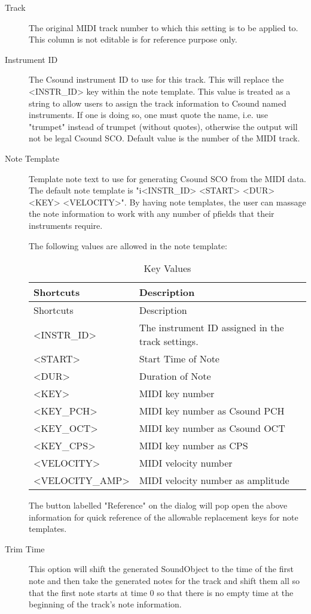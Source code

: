 \begin{description}
\item[Track]
The original MIDI track number to which this setting is to be applied
to. This column is not editable is for reference purpose only.
\item[Instrument ID]
The Csound instrument ID to use for this track. This will replace the
\textless{}INSTR\_ID\textgreater{} key within the note template. This
value is treated as a string to allow users to assign the track
information to Csound named instruments. If one is doing so, one must
quote the name, i.e. use "trumpet" instead of trumpet (without quotes),
otherwise the output will not be legal Csound SCO. Default value is the
number of the MIDI track.
\item[Note Template]
Template note text to use for generating Csound SCO from the MIDI data.
The default note template is "i\textless{}INSTR\_ID\textgreater{}
\textless{}START\textgreater{} \textless{}DUR\textgreater{}
\textless{}KEY\textgreater{} \textless{}VELOCITY\textgreater{}". By
having note templates, the user can massage the note information to work
with any number of pfields that their instruments require.

The following values are allowed in the note template:

\begin{longtable}[]{@{}ll@{}}
\caption{Key Values}\tabularnewline
\toprule
Shortcuts & Description\tabularnewline
\midrule
\endfirsthead
\toprule
Shortcuts & Description\tabularnewline
\midrule
\endhead
\textless{}INSTR\_ID\textgreater{} & The instrument ID assigned in the
track settings.\tabularnewline
\textless{}START\textgreater{} & Start Time of Note\tabularnewline
\textless{}DUR\textgreater{} & Duration of Note\tabularnewline
\textless{}KEY\textgreater{} & MIDI key number\tabularnewline
\textless{}KEY\_PCH\textgreater{} & MIDI key number as Csound
PCH\tabularnewline
\textless{}KEY\_OCT\textgreater{} & MIDI key number as Csound
OCT\tabularnewline
\textless{}KEY\_CPS\textgreater{} & MIDI key number as
CPS\tabularnewline
\textless{}VELOCITY\textgreater{} & MIDI velocity number\tabularnewline
\textless{}VELOCITY\_AMP\textgreater{} & MIDI velocity number as
amplitude\tabularnewline
\bottomrule
\end{longtable}

The button labelled "Reference" on the dialog will pop open the above
information for quick reference of the allowable replacement keys for
note templates.
\item[Trim Time]
This option will shift the generated SoundObject to the time of the
first note and then take the generated notes for the track and shift
them all so that the first note starts at time 0 so that there is no
empty time at the beginning of the track's note information.
\end{description}

